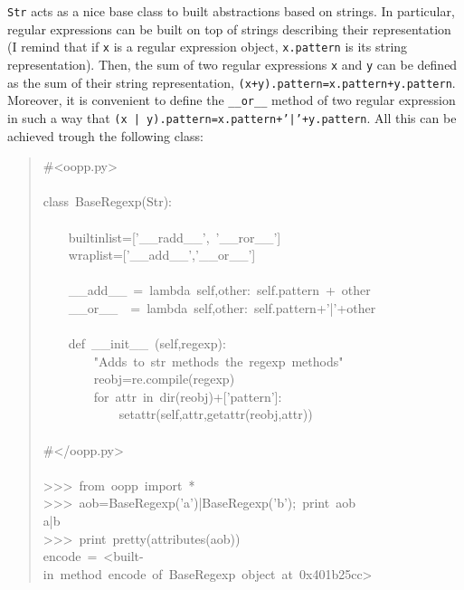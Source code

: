 \documentclass[10pt,english]{article}
\begin{document}
\texttt{Str} acts as a nice base class to built abstractions based on strings.
In particular, regular expressions can be built on top of strings describing
their representation (I remind that if \texttt{x} is a regular expression object, 
\texttt{x.pattern} is its string representation). Then, the sum of two regular 
expressions \texttt{x} and \texttt{y} can be defined as the sum of their string 
representation, \texttt{(x+y).pattern=x.pattern+y.pattern}. Moreover, it is
convenient to define the \texttt{{\_}{\_}or{\_}{\_}} method of two regular expression in
such a way that \texttt{(x | y).pattern=x.pattern+'|'+y.pattern}.
All this can be achieved trough the following class:
\begin{quote}
\begin{ttfamily}\begin{flushleft}
\mbox{{\#}<oopp.py>}\\
\mbox{}\\
\mbox{class~BaseRegexp(Str):}\\
\mbox{}\\
\mbox{~~~~builtinlist=['{\_}{\_}radd{\_}{\_}',~'{\_}{\_}ror{\_}{\_}']}\\
\mbox{~~~~wraplist=['{\_}{\_}add{\_}{\_}','{\_}{\_}or{\_}{\_}']}\\
\mbox{}\\
\mbox{~~~~{\_}{\_}add{\_}{\_}~=~lambda~self,other:~self.pattern~+~other~}\\
\mbox{~~~~{\_}{\_}or{\_}{\_}~~=~lambda~self,other:~self.pattern+'|'+other}\\
\mbox{}\\
\mbox{~~~~def~{\_}{\_}init{\_}{\_}~(self,regexp):}\\
\mbox{~~~~~~~~"Adds~to~str~methods~the~regexp~methods"}\\
\mbox{~~~~~~~~reobj=re.compile(regexp)}\\
\mbox{~~~~~~~~for~attr~in~dir(reobj)+['pattern']:}\\
\mbox{~~~~~~~~~~~~setattr(self,attr,getattr(reobj,attr))}\\
\mbox{}\\
\mbox{{\#}</oopp.py>}\\
\mbox{}\\
\mbox{>>>~from~oopp~import~*}\\
\mbox{>>>~aob=BaseRegexp('a')|BaseRegexp('b');~print~aob}\\
\mbox{a|b}\\
\mbox{>>>~print~pretty(attributes(aob))}\\
\mbox{encode~=~<built-in~method~encode~of~BaseRegexp~object~at~0x401b25cc>}\\

\end{flushleft}
\end{ttfamily}
\end{quote}
\end{document}
